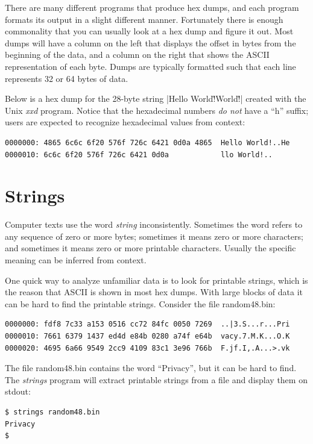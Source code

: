 There are many different programs that produce hex dumps, and each
program formats its output in a slight different manner. Fortunately
there is enough commonality that you can usually look at a hex dump
and figure it out. Most dumps will have a column on the left that
displays the offset in bytes from the beginning of the data, and a
column on the right that shows the ASCII representation of each
byte. Dumps are typically formatted such that each line represents 32
or 64 bytes of data.

Below is a hex dump for the 28-byte string 
|Hello World!\r\nHello World!\r\n| created with the Unix \emph{xxd}
program. Notice that the hexadecimal numbers \emph{do not} have a
``h'' suffix; users are expected to recognize hexadecimal values from
context:

\begin{Verbatim}
0000000: 4865 6c6c 6f20 576f 726c 6421 0d0a 4865  Hello World!..He
0000010: 6c6c 6f20 576f 726c 6421 0d0a            llo World!..
\end{Verbatim}


\section{Strings}\label{sec:strings}

Computer texts use the word \emph{string} inconsistently. Sometimes
the word refers to any sequence of zero or more bytes; sometimes it
means zero or more characters; and sometimes it means zero or
more printable characters. Usually the specific meaning can be
inferred from context. 

One quick way to analyze unfamiliar data is to look for printable
strings, which is the reason that ASCII is shown in most hex
dumps. With large blocks of data it can be hard to find the printable
strings. Consider the file random48.bin:

\begin{Verbatim}
0000000: fdf8 7c33 a153 0516 cc72 84fc 0050 7269  ..|3.S...r...Pri
0000010: 7661 6379 1437 ed4d e84b 0280 a74f e64b  vacy.7.M.K...O.K
0000020: 4695 6a66 9549 2cc9 4109 83c1 3e96 766b  F.jf.I,.A...>.vk
\end{Verbatim}

The file random48.bin contains the word ``Privacy'', but it can be hard to
find. The \emph{strings} program will extract printable
strings from a file and display them on stdout:

\begin{Verbatim}
$ strings random48.bin 
Privacy
$ 
\end{Verbatim}

